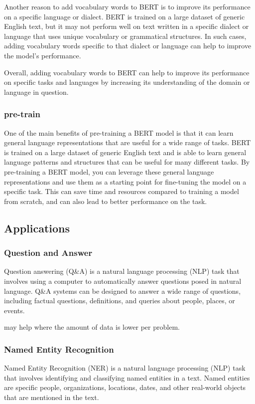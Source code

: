 Another reason to add vocabulary words to BERT is to improve its performance on a specific language or dialect. BERT is trained on a large dataset of generic English text, but it may not perform well on text written in a specific dialect or language that uses unique vocabulary or grammatical structures. In such cases, adding vocabulary words specific to that dialect or language can help to improve the model's performance.

Overall, adding vocabulary words to BERT can help to improve its performance on specific tasks and languages by increasing its understanding of the domain or language in question.

\subsubsection{pre-train} One of the main benefits of pre-training a BERT model is that it can learn general language representations that are useful for a wide range of tasks. BERT is trained on a large dataset of generic English text and is able to learn general language patterns and structures that can be useful for many different tasks. By pre-training a BERT model, you can leverage these general language representations and use them as a starting point for fine-tuning the model on a specific task. This can save time and resources compared to training a model from scratch, and can also lead to better performance on the task.

\subsection{Applications}

\subsubsection{Question and Answer} Question answering (Q&A) is a natural language processing (NLP) task that involves using a computer to automatically answer questions posed in natural language. Q&A systems can be designed to answer a wide range of questions, including factual questions, definitions, and queries about people, places, or events.

may help where the amount of data is lower per problem.

\subsubsection{Named Entity Recognition} Named Entity Recognition (NER) is a natural language processing (NLP) task that involves identifying and classifying named entities in a text. Named entities are specific people, organizations, locations, dates, and other real-world objects that are mentioned in the text.

